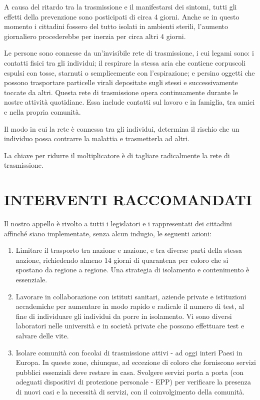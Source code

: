 \documentclass[onecolumn,journal]{IEEEtran}
\begin{document}
\begin{multicols}{2}
  A causa del ritardo tra la trasmissione e il manifestarsi dei sintomi, tutti gli effetti della prevenzione sono posticipati di circa 4 giorni. Anche se in questo momento i cittadini fossero del tutto isolati in ambienti sterili, l’aumento giornaliero procederebbe per inerzia per circa altri 4 giorni.

  Le persone sono connesse da un’invisibile rete di trasmissione, i cui legami sono: i contatti fisici tra gli individui; il respirare la stessa aria che contiene corpuscoli espulsi con tosse, starnuti o semplicemente con l’espirazione; e persino oggetti che possono trasportare particelle virali depositate sugli stessi e successivamente toccate da altri. Questa rete di trasmissione opera continuamente durante le nostre attività quotidiane. Essa include contatti sul lavoro e in famiglia, tra amici e nella propria comunità.

  Il modo in cui la rete è connessa tra gli individui, determina il rischio che un individuo possa contrarre la malattia e trasmetterla ad altri.

  La chiave per ridurre il moltiplicatore è di tagliare radicalmente la rete di trasmissione.

\section*{INTERVENTI RACCOMANDATI}

Il nostro appello è rivolto a tutti i legislatori e i rappresentati dei cittadini affinché siano implementate, senza alcun indugio, le seguenti azioni:

\begin{enumerate}

\item Limitare il trasporto tra nazione e nazione, e tra diverse parti della stessa nazione, richiedendo almeno 14 giorni di quarantena per coloro che si spostano da regione a regione. Una strategia di isolamento e contenimento è essenziale.

\item Lavorare in collaborazione con istituti sanitari, aziende private e istituzioni accademiche per aumentare in modo rapido e radicale il numero di test, al fine di individuare gli individui da porre in isolamento. Vi sono diversi laboratori nelle università e in società private che possono effettuare test e salvare delle vite.

\item Isolare comunità con focolai di trasmissione attivi - ad oggi interi Paesi in Europa. In queste zone, chiunque, ad eccezione di coloro che forniscono servizi pubblici essenziali deve restare in casa. Svolgere servizi porta a porta (con adeguati dispositivi di protezione personale - EPP) per verificare la presenza di nuovi casi e la necessità di servizi, con il coinvolgimento della comunità.


\end{enumerate}
\end{multicols}
\end{document}
